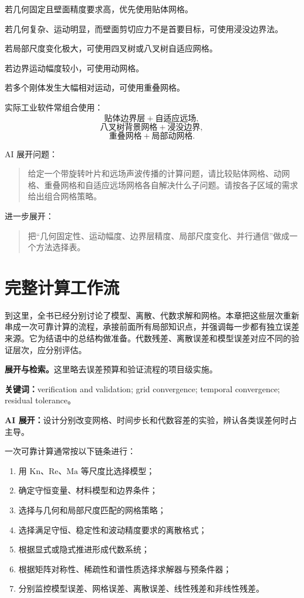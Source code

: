 \documentclass[11pt,openany]{ctexbook}
\newcommand{\studyroute}[3]{%
  \par\smallskip\noindent\textbf{展开与检索。}#1\par
  \noindent\textbf{关键词：}#2。\par
  \noindent\textbf{AI 展开：}#3\par
}
\begin{document}
若几何固定且壁面精度要求高，优先使用贴体网格。

若几何复杂、运动明显，而壁面剪切应力不是首要目标，可使用浸没边界法。

若局部尺度变化极大，可使用四叉树或八叉树自适应网格。

若边界运动幅度较小，可使用动网格。

若多个刚体发生大幅相对运动，可使用重叠网格。

实际工业软件常组合使用：
\[
\text{贴体边界层}
+
\text{自适应远场},
\]
\[
\text{八叉树背景网格}
+
\text{浸没边界},
\]
\[
\text{重叠网格}
+
\text{局部动网格}.
\]

\begin{askai}
AI 展开问题：
\begin{quote}
给定一个带旋转叶片和远场声波传播的计算问题，请比较贴体网格、动网格、重叠网格和自适应远场网格各自解决什么子问题。请按各子区域的需求给出组合网格策略。
\end{quote}

进一步展开：
\begin{quote}
把“几何固定性、运动幅度、边界层精度、局部尺度变化、并行通信”做成一个方法选择表。
\end{quote}
\end{askai}

\chapter{完整计算工作流}

\begin{chaptersummary}
到这里，全书已经分别讨论了模型、离散、代数求解和网格。本章把这些层次重新串成一次可靠计算的流程，承接前面所有局部知识点，并强调每一步都有独立误差来源。它为结语中的总结构做准备。代数残差、离散误差和模型误差对应不同的验证层次，应分别评估。
\end{chaptersummary}
\studyroute{这里略去误差预算和验证流程的项目级实施。}{verification and validation; grid convergence; temporal convergence; residual tolerance}{设计分别改变网格、时间步长和代数容差的实验，辨认各类误差何时占主导。}

一次可靠计算通常按以下链条进行：

\begin{enumerate}
  \item 用 \(\mathrm{Kn}\)、\(\mathrm{Re}\)、\(\mathrm{Ma}\) 等尺度比选择模型；
  \item 确定守恒变量、材料模型和边界条件；
  \item 选择与几何和局部尺度匹配的网格策略；
  \item 选择满足守恒、稳定性和波动精度要求的离散格式；
  \item 根据显式或隐式推进形成代数系统；
  \item 根据矩阵对称性、稀疏性和谱性质选择求解器与预条件器；
  \item 分别监控模型误差、网格误差、离散误差、线性残差和非线性残差。
\end{enumerate}
\end{document}
